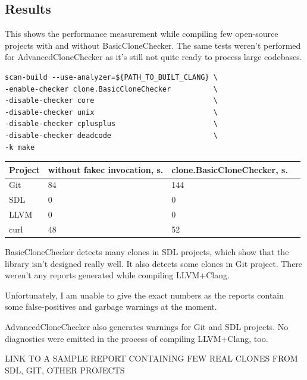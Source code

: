 \documentclass[a0,portrait]{a0poster}
\begin{document}
\begin{multicols}{2}
\section*{Results}

This shows the performance measurement while compiling few open-source projects with and without
BasicCloneChecker. The same tests weren't performed for AdvancedCloneChecker as it's still not
quite ready to process large codebases.

\begin{lstlisting}[frame=single]
scan-build --use-analyzer=${PATH_TO_BUILT_CLANG} \
-enable-checker clone.BasicCloneChecker          \
-disable-checker core                            \
-disable-checker unix                            \
-disable-checker cplusplus                       \
-disable-checker deadcode                        \
-k make
\end{lstlisting}

\begin{center}\vspace{1cm}
\begin{tabular}{l l l l}
\toprule
\textbf{Project} & \textbf{without fakec invocation, s.} & \textbf{clone.BasicCloneChecker, s.}\\
\midrule
Git &  84 & 144 \\
SDL &  0  & 0   \\
LLVM & 0  & 0   \\
curl & 48 & 52  \\
\bottomrule
\end{tabular}
\end{center}\vspace{1cm}

BasicCloneChecker detects many clones in SDL projects, which show that the library isn't designed
really well. It also detects some clones in Git project. There weren't any reports generated while
compiling LLVM+Clang.

Unfortunately, I am unable to give the exact numbers as the reports contain some false-positives
and garbage warnings at the moment.

AdvancedCloneChecker also generates warnings for Git and SDL projects. No diagnostics were emitted
in the process of compiling LLVM+Clang, too.

LINK TO A SAMPLE REPORT CONTAINING FEW REAL CLONES FROM SDL, GIT, OTHER PROJECTS



\end{multicols}
\end{document}
